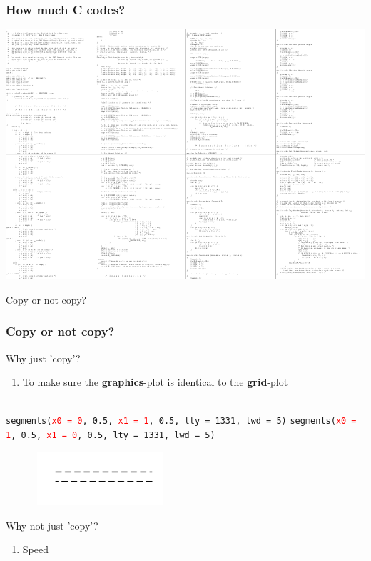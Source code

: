 \documentclass{beamer}
\begin{document}

\begin{frame}[fragile]
\frametitle{How much \textbf{C} codes?}
\begin{center}
\includegraphics{plot/code.png}
\end{center}
\end{frame}



\begin{frame}[fragile]
\begin{center}
\Huge Copy or not copy?
\end{center}
\end{frame}


\begin{frame}[fragile]
\frametitle{Copy or not copy?}
Why just 'copy'?

\begin{enumerate}
  \item To make sure the \textbf{graphics}-plot is identical to the \textbf{grid}-plot\\~\\
\end{enumerate}

\texttt{segments(\textcolor{red}{x0 = 0}, 0.5, \textcolor{red}{x1 = 1}, 0.5, lty = 1331, lwd = 5)}
\texttt{segments(\textcolor{red}{x0 = 1}, 0.5, \textcolor{red}{x1 = 0}, 0.5, lty = 1331, lwd = 5)}
\begin{center}
  \includegraphics[height = 2cm, width = 7cm]{plot/Rcopy.pdf}
\end{center}


Why not just 'copy'?
\begin{enumerate}
  \item Speed
\end{enumerate}


\end{frame}
\end{document}
